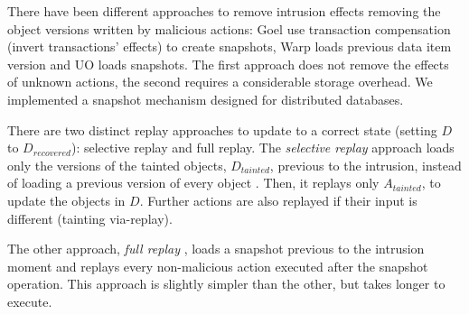There have been different approaches to remove intrusion effects removing the object versions written by malicious actions: Goel \cite{Akkus2010} use transaction compensation (invert transactions' effects) to create snapshots, Warp loads previous data item version and UO loads snapshots. The first approach does not remove the effects of unknown actions, the second requires a considerable storage overhead. We implemented a snapshot mechanism designed for distributed databases. %


There are two distinct replay approaches to update to a correct state (setting $D$ to $D_{recovered}$): selective replay and full replay. 
The \textit{selective replay} approach loads only the versions of the tainted objects, $D_{tainted}$, previous to the intrusion, instead of loading a previous version of every object \cite{taser,warp,Akkus2010}. Then, it replays only $A_{tainted}$, to update the objects in $D$. Further actions are also replayed if their input is different (tainting via-replay). 

The other approach, \textit{full replay} \cite{undoForOperators}, loads a snapshot previous to the intrusion moment and replays every non-malicious action executed after the snapshot operation. This approach is slightly simpler than the other, but takes longer to execute.  


